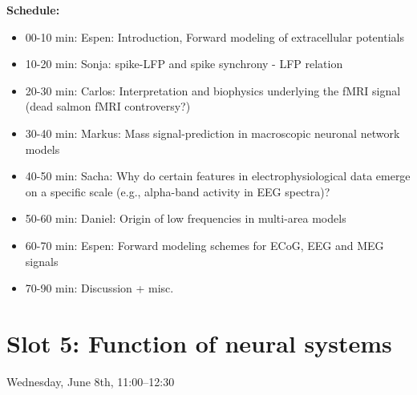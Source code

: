 \documentclass[10pt, a4paper,twoside,american]{article}
\begin{document}
\begin{enumerate}[resume]
  {\bf Schedule:}
  \begin{itemize}
  \item 00-10 min: Espen: Introduction, Forward modeling of extracellular potentials
  \item 10-20 min: Sonja: spike-LFP and spike synchrony - LFP relation
  \item 20-30 min: Carlos: Interpretation and biophysics underlying the fMRI signal (dead salmon fMRI controversy?) 
  \item 30-40 min: Markus: Mass signal-prediction in macroscopic neuronal network models
  \item 40-50 min: Sacha: Why do certain features in electrophysiological data emerge on a specific scale (e.g., alpha-band activity in EEG spectra)?
  \item 50-60 min: Daniel: Origin of low frequencies in multi-area models
  \item 60-70 min: Espen: Forward modeling schemes for ECoG, EEG and MEG signals
  \item 70-90 min: Discussion + misc.
  \end{itemize}
\end{enumerate}

\section*{Slot 5: Function of neural systems}
Wednesday, June 8th, 11:00--12:30
\end{document}
